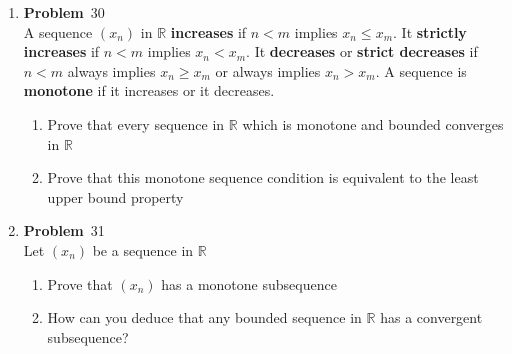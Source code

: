 \documentclass[12pt]{amsart}
\newcommand{\benu}{\begin{enumerate}}
\newcommand{\eenu}{\end{enumerate}}
\theoremstyle{definition}
\newcommand{\mbR}{\mathbb{R}}
\newcommand{\itep}{\item {\bfseries Problem}\ }
\begin{document}
\begin{enumerate}[series=p]
\itep 30\\
A sequence $(x_n)$ in $\mbR$ \textbf{increases} if $n< m$ implies $x_n \leq x_m$.  It \textbf{strictly increases} if $n < m$ implies $x_n < x_m$.  It \textbf{decreases} or \textbf{strict decreases} if $n < m$ always implies $x_n \geq x_m$ or always implies $x_n > x_m$.  A sequence is \textbf{monotone} if it increases or it decreases.
\benu
\item Prove that every sequence in $\mbR$ which is monotone and bounded converges in $\mbR$
\item Prove that this monotone sequence condition is equivalent to the least upper bound property
\eenu

\newpage

\itep 31\\
Let $(x_n)$ be a sequence in $\mbR$
\benu
\item Prove that $(x_n)$ has a monotone subsequence
\item How can you deduce that any bounded sequence in $\mbR$ has a convergent subsequence?
\eenu


\end{enumerate}
\end{document}
